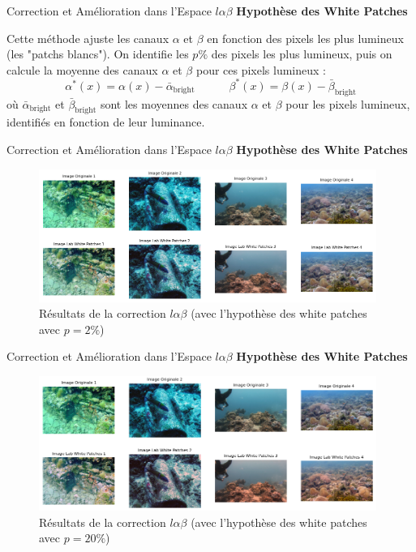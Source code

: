 \documentclass[8pt,a4paper]{beamer}
\numberwithin{figure}{section}
\begin{document}
\begin{frame}{Correction et Amélioration dans l'Espace \( l\alpha\beta \)}
\textbf{Hypothèse des White Patches}
\vspace{3mm}
\par Cette méthode ajuste les canaux \( \alpha \) et \( \beta \) en fonction des pixels les plus lumineux (les "patchs blancs"). On identifie les \( p\% \) des pixels les plus lumineux, puis on calcule la moyenne des canaux \( \alpha \) et \( \beta \) pour ces pixels lumineux :
   \[
   \alpha^*(x) = \alpha(x) - \bar{\alpha}_{\text{bright}} \quad\quad\quad \beta^*(x) = \beta(x) - \bar{\beta}_{\text{bright}}
   \]
   où \( \bar{\alpha}_{\text{bright}} \) et \( \bar{\beta}_{\text{bright}} \) sont les moyennes des canaux \( \alpha \) et \( \beta \) pour les pixels lumineux, identifiés en fonction de leur luminance.
\end{frame}

\begin{frame}{Correction et Amélioration dans l'Espace \( l\alpha\beta \)}
\textbf{Hypothèse des White Patches}
\vspace{3mm}  
\begin{figure}[h!]
\begin{center}
\includegraphics[width=11cm]{image012.png}
\end{center}
\label{figure2.d3}
\caption{Résultats de la correction $l\alpha\beta$ (avec l'hypothèse des white patches avec $p=2\%$) }
\end{figure}
\end{frame}

\begin{frame}{Correction et Amélioration dans l'Espace \( l\alpha\beta \)}
\textbf{Hypothèse des White Patches}
\vspace{3mm}  
\begin{figure}[h!]
\begin{center}
\includegraphics[width=11cm]{image011.png}
\end{center}
\label{figure2.s3}
\caption{Résultats de la correction $l\alpha\beta$ (avec l'hypothèse des white patches avec $p=20\%$) }
\end{figure}
\end{frame}
\end{document}

